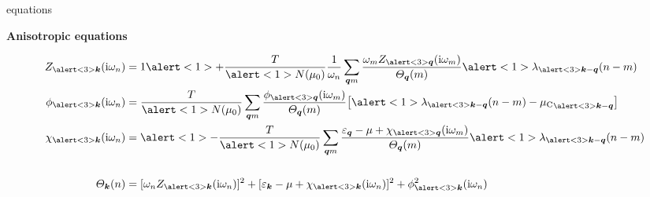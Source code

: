 \documentclass[10pt]{beamer}
\begin{document}
    \begin{frame}[label=Eliashberg2]{ equations}
        \begin{center} \bf
            Anisotropic equations
        \end{center}
        \begin{align*}
            Z_{\alert<3>{\vec k}}(\I \omega_n)
            &= 1 \alert<1>+ \frac T {\alert<1>{N(\mu_0)}} \frac 1 {\omega_n}
            \sum_{\vec q m} \frac
                {\omega_m Z_{\alert<3>{\vec q}}(\I \omega_m)}
                {\Theta_{\vec q}(m)}
            \alert<1>{\lambda_{\alert<3>{\vec k - \vec q}}(n - m)}
            \\
            \phi_{\alert<3>{\vec k}}(\I \omega_n)
            &= \frac T {\alert<1>{N(\mu_0)}}
            \sum_{\vec q m} \frac
                {\phi_{\alert<3>{\vec q}}(\I \omega_m)}
                {\Theta_{\vec q}(m)}
            \big[
                \alert<1>{\lambda_{\alert<3>{\vec k - \vec q}}(n - m)
                - {\mu \sub C}_{\alert<3>{\vec k - \vec q}}}
            \big]
            \\
            \chi_{\alert<3>{\vec k}}(\I \omega_n)
            &= \alert<1> -\frac T {\alert<1>{N(\mu_0)}}
            \sum_{\vec q m} \frac
                { \epsilon_{\vec q} - \mu
                + \chi_{\alert<3>{\vec q}}(\I \omega_m) }
                {\Theta_{\vec q}(m)}
            \alert<1>{\lambda_{\alert<3>{\vec k - \vec q}}(n - m)}
            \\
            \hspace{2cm} & \hspace{8cm}
            \\
            \Theta_{\vec k}(n)
            &= [\omega_n Z_{\alert<3>{\vec k}}(\I \omega_n)]^2
            + [\epsilon_{\vec k} - \mu
            + \chi_{\alert<3>{\vec k}}(\I \omega_n)]^2
            + \phi^2_{\alert<3>{\vec k}}(\I \omega_n)
        \end{align*}
    \end{frame}
\end{document}
